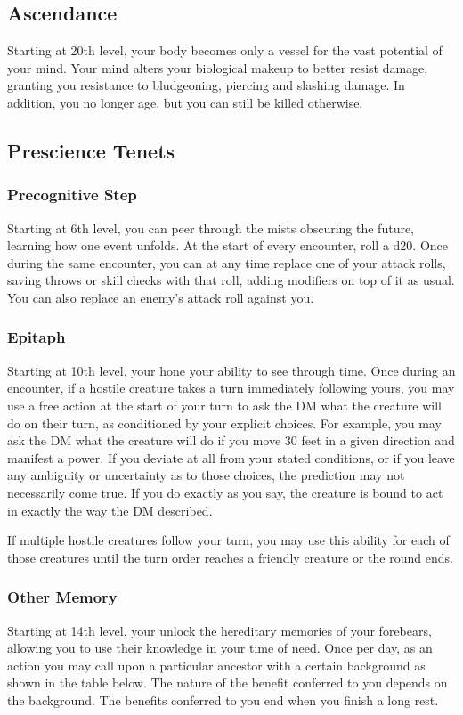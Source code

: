 \subsection{Ascendance}
Starting at 20th level,
your body becomes only a vessel for the vast potential
of your mind.
Your mind alters your biological makeup to better resist damage,
granting you resistance to bludgeoning, piercing and slashing damage.
In addition,
you no longer age,
but you can still be killed otherwise.

\subsection{Prescience Tenets}

\subsubsection{Precognitive Step}
Starting at 6th level,
you can peer through the mists obscuring the future,
learning how one event unfolds.
At the start of every encounter, roll a d20.
Once during the same encounter,
you can at any time replace one of your attack rolls,
saving throws or skill checks with that roll,
adding modifiers on top of it as usual.
You can also replace an enemy's attack roll against you.

\subsubsection{Epitaph}
Starting at 10th level,
your hone your ability to see through time.
Once during an encounter,
if a hostile creature takes a turn immediately following yours,
you may use a free action at the start of your turn
to ask the DM what the creature will do on their turn,
as conditioned by your explicit choices.
For example,
you may ask the DM what the creature will do
if you move 30 feet in a given direction and manifest a power.
If you deviate at all from your stated conditions,
or if you leave any ambiguity or uncertainty as to those choices,
the prediction may not necessarily come true.
If you do exactly as you say,
the creature is bound to act in exactly the way the DM described.

If multiple hostile creatures follow your turn,
you may use this ability for each of those creatures
until the turn order reaches a friendly creature
or the round ends.

\subsubsection{Other Memory}
Starting at 14th level,
your unlock the hereditary memories of your forebears,
allowing you to use their knowledge in your time of need.
Once per day, as an action you may call upon a particular ancestor
with a certain background as shown in the table below.
The nature of the benefit conferred to you depends on the background.
The benefits conferred to you end when you finish a long rest.

